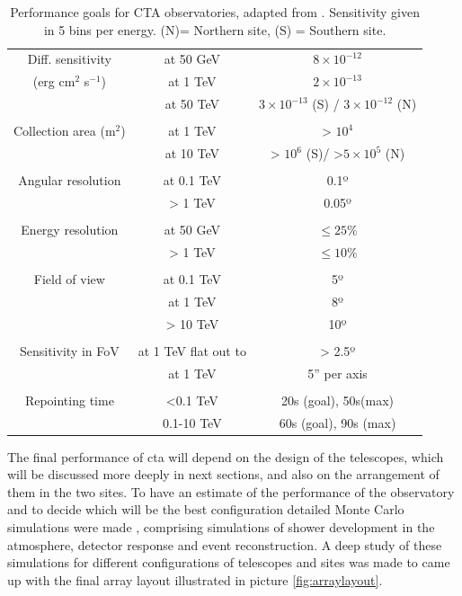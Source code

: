 \documentclass[main.tex]{subfiles}
\begin{document}
\begin{table}
  \centering
  \begin{tabular}{ccc}
    \hline
    Diff. sensitivity & at 50 GeV & $8\times10^{-12}$\\
    (erg cm$^2$ s$^{-1}$) & at 1 TeV & $2\times10^{-13}$\\
     & at 50 TeV & $3\times10^{-13}$ (S) / $3\times10^{-12}$ (N)\\\\
    Collection area (m$^{2}$) & at 1 TeV & > $10^4$ \\
    & at 10 TeV & > $10^6$ (S)/ >$5\times10^5$ (N) \\\\
    Angular resolution & at 0.1 TeV & 0.1º \\
    & > 1 TeV & 0.05º \\\\
    Energy resolution & at 50 GeV & $\le 25\%$ \\
    & > 1 TeV & $\le 10\%$ \\\\
    Field of view & at 0.1 TeV & 5º\\
    & at 1 TeV & 8º\\
    & > 10 TeV & 10º\\\\
    Sensitivity in FoV & at 1 TeV flat out to & > 2.5º \\
    & at 1 TeV & 5'' per axis \\\\
    Repointing time & <0.1 TeV  & 20s (goal), 50s(max) \\
    & 0.1-10 TeV & 60s (goal), 90s (max) \\
    \hline
  \end{tabular}
  \caption{Performance goals for CTA observatories, adapted from \cite{CTAconcept}. Sensitivity given in 5 bins per energy. (N)= Northern site, (S) = Southern site.}
  \label{tab:CTAgoals}
\end{table}

The final performance of \gls{cta} will depend on the design of the telescopes, which will be discussed more deeply in next sections, and also on the arrangement of them in the two sites.
To have an estimate of the performance of the observatory and to decide which will be the best configuration detailed Monte Carlo simulations were made \cite{2013CTAMonteCarlo}, comprising simulations of shower development in the atmosphere, detector response and event reconstruction.
A deep study of these simulations \cite{2017CTAMCPerformance} for different configurations of telescopes and sites was made to came up with the final array layout illustrated in picture \ref{fig:arraylayout}.
\end{document}
